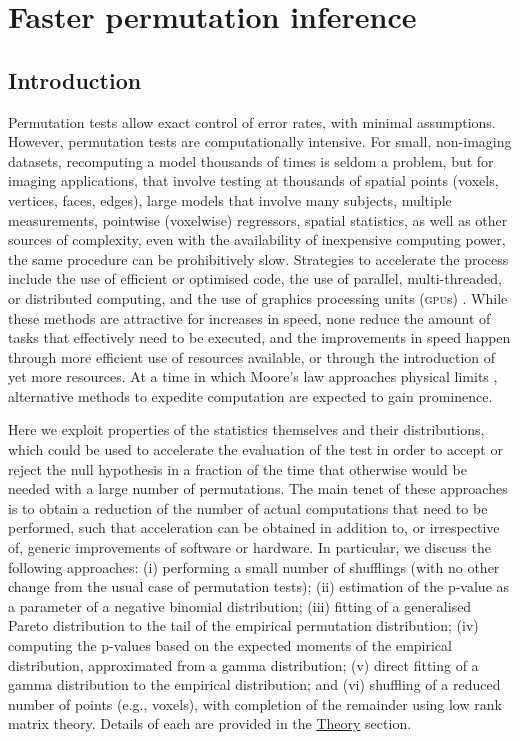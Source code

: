 \chapter{Faster permutation inference}
\label{sec:accel}
\setstretch{\lspac}

\section{Introduction}
\label{sec:accel:intro}
\setstretch{\lspac}

Permutation tests allow exact control of error rates, with minimal assumptions. However, permutation tests are computationally intensive. For small, non-imaging datasets, recomputing a model thousands of times is seldom a problem, but for imaging applications, that involve testing at thousands of spatial points (voxels, vertices, faces, edges), large models that involve many subjects, multiple measurements, pointwise (voxelwise) regressors, spatial statistics, as well as other sources of complexity, even with the availability of inexpensive computing power, the same procedure can be prohibitively slow. Strategies to accelerate the process include the use of efficient or optimised code, the use of parallel, multi-threaded, or distributed computing, and the use of graphics processing units (\textsc{gpu}s) \citep[for example applications of the latter, see][]{Eklund2012, Eklund2013, Hernandez2013}. While these methods are attractive for increases in speed, none reduce the amount of tasks that effectively need to be executed, and the improvements in speed happen through more efficient use of resources available, or through the introduction of yet more resources. At a time in which Moore's law \citep{Moore1965} approaches physical limits \citep{Waldrop2016}, alternative methods to expedite computation are expected to gain prominence.

Here we exploit properties of the statistics themselves and their distributions, which could be used to accelerate the evaluation of the test in order to accept or reject the null hypothesis in a fraction of the time that otherwise would be needed with a large number of permutations. The main tenet of these approaches is to obtain a reduction of the number of actual computations that need to be performed, such that acceleration can be obtained in addition to, or irrespective of, generic improvements of software or hardware. In particular, we discuss the following approaches: ({i}) performing a small number of shufflings (with no other change from the usual case of permutation tests); ({ii}) estimation of the p-value as a parameter of a negative binomial distribution; ({iii}) fitting of a generalised Pareto distribution to the tail of the empirical permutation distribution; ({iv}) computing the p-values based on the expected moments of the empirical distribution, approximated from a gamma distribution; ({v}) direct fitting of a gamma distribution to the empirical distribution; and ({vi}) shuffling of a reduced number of points (e.g., voxels), with completion of the remainder using low rank matrix theory. Details of each are provided in the \href{sec:accel:theory}{Theory} section.

